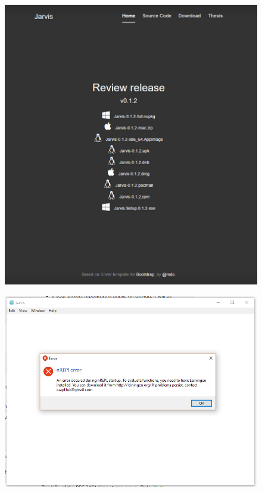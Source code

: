 \documentclass[11pt]{scrartcl}
\begin{document}
\begin{figure}[hbt]
  \centering
  \begin{minipage}{0.48\linewidth}
    \centering
    \includegraphics[width=0.9\linewidth]{img/j-inst}
\label{fig:j-inst} 
  \end{minipage}%
  \begin{minipage}{0.48\linewidth}
    \centering
    \includegraphics[width=0.9\linewidth]{img/j-error}
\label{fig:j-error}
  \end{minipage}
\end{figure}
\end{document}
